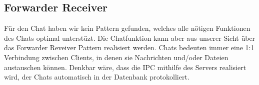 \documentclass[a4paper,10pt]{article}
\begin{document}
\subsection{Forwarder Receiver}
Für den Chat haben wir kein Pattern gefunden, welches alle nötigen Funktionen des Chats optimal unterstüzt. Die Chatfunktion kann aber aus unserer Sicht über das Forwarder Reveiver Pattern realisiert werden. Chats bedeuten immer eine 1:1 Verbindung zwischen Clients, in denen sie Nachrichten und/oder Dateien austauschen können. Denkbar wäre, dass die IPC mithilfe des Servers realisiert wird, der Chats automatisch in der Datenbank protokolliert.
\end{document}

